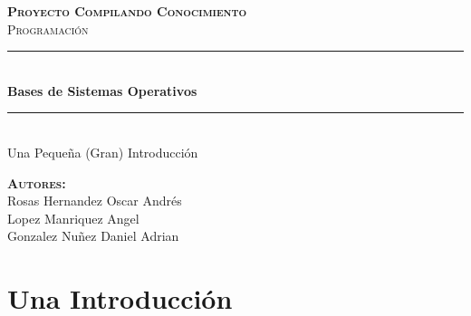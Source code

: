 \documentclass[12pt, fleqn]{report}                             %
\author{Oscar Andrés Rosas}                                     %
\begin{document}
\begin{titlepage}

    \center
    \textbf{\textsc{\Large Proyecto Compilando Conocimiento}}\\[1.0cm] 
    \textsc{\Large Programación}\\[1.0cm] 

    \rule{\linewidth}{0.5mm} \\[1.0cm]
        { \huge \bfseries Bases de Sistemas Operativos}\\[1.0cm] 
    \rule{\linewidth}{0.5mm} \\[2.0cm]
    
    {\LARGE Una Pequeña (Gran) Introducción}\\[7cm] 
    
    \begin{center} \large
    \textbf{\textsc{Autores:}}\\
        Rosas Hernandez Oscar Andrés    \\
        Lopez Manriquez Angel           \\
        Gonzalez Nuñez Daniel Adrian
    \end{center}

    \vfill

\end{titlepage}

\tableofcontents{}
\label{sec:Index}

\clearpage




\part{Una Introducción}
\clearpage


\end{document}
